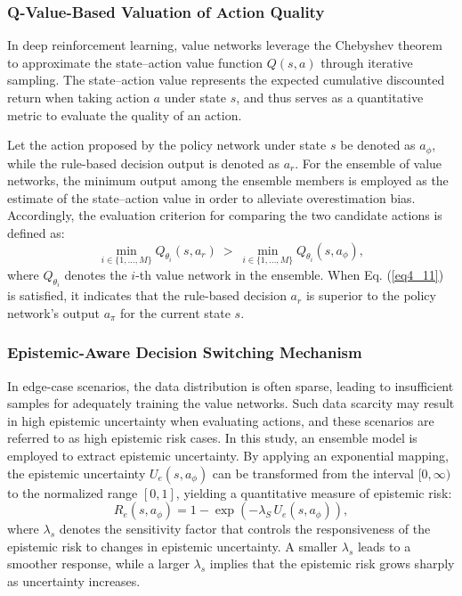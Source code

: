 \documentclass[preprint,12pt,authoryear]{elsarticle}
\begin{document}
\subsubsection{Q-Value-Based Valuation of Action Quality}

In deep reinforcement learning, value networks leverage the Chebyshev theorem to approximate the state–action value function $Q(s,a)$ through iterative sampling. The state–action value represents the expected cumulative discounted return when taking action $a$ under state $s$, and thus serves as a quantitative metric to evaluate the quality of an action. 

Let the action proposed by the policy network under state $s$ be denoted as $a_{\phi}$, while the rule-based decision output is denoted as $a_{r}$. For the ensemble of value networks, the minimum output among the ensemble members is employed as the estimate of the state–action value in order to alleviate overestimation bias. Accordingly, the evaluation criterion for comparing the two candidate actions is defined as:
\begin{equation}
\min_{i \in \{1,\dots,M\}} Q_{\theta_i}(s,a_{r}) 
\ > \ \min_{i \in \{1,\dots,M\}} Q_{\theta_i}(s,a_{\phi}),
\label{eq4_11}
\end{equation}
where $Q_{\theta_i}$ denotes the $i$-th value network in the ensemble. When Eq. (\ref{eq4_11}) is satisfied, it indicates that the rule-based decision $a_{r}$ is superior to the policy network’s output $a_{\pi}$ for the current state $s$.

\subsubsection{Epistemic-Aware Decision Switching Mechanism}

In edge-case scenarios, the data distribution is often sparse, leading to insufficient samples for adequately training the value networks. Such data scarcity may result in high epistemic uncertainty when evaluating actions, and these scenarios are referred to as high epistemic risk cases. In this study, an ensemble model is employed to extract epistemic uncertainty. By applying an exponential mapping, the epistemic uncertainty $U_e(s,a_\phi)$ can be transformed from the interval $[0, \infty)$ to the normalized range $[0,1]$, yielding a quantitative measure of epistemic risk: 
\begin{equation}
R_e(s,a_\phi) = 1 - \exp\left(-\lambda_S \, U_e(s,a_\phi)\right),
\label{eq4_12}
\end{equation}
where $\lambda_s$ denotes the sensitivity factor that controls the responsiveness of the epistemic risk to changes in epistemic uncertainty. A smaller $\lambda_s$ leads to a smoother response, while a larger $\lambda_s$ implies that the epistemic risk grows sharply as uncertainty increases.
\end{document}
